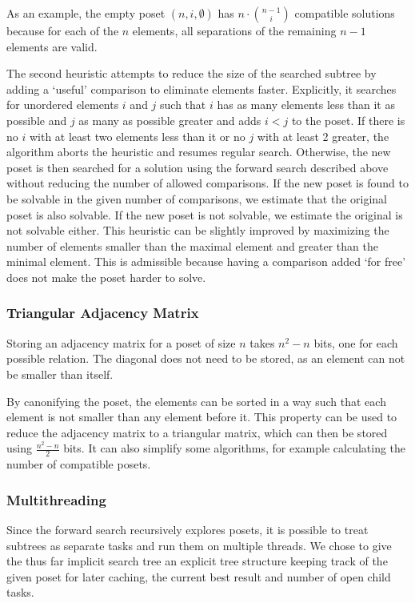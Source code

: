 \documentclass[10pt,journal,compsoc]{IEEEtran}
\begin{document}
As an example, the empty poset $(n,i,\emptyset)$ has $n \cdot \binom{n - 1}{i}$ compatible solutions because
for each of the $n$ elements, all separations of the remaining $n - 1$ elements
are valid.


The second heuristic attempts to reduce the size of the searched subtree by adding a `useful' comparison to eliminate elements faster.
Explicitly, it searches for unordered elements $i$ and $j$ such that $i$ has as many elements less than it as possible and $j$ as many as possible greater and adds $i < j$ to the poset.
If there is no $i$ with at least two elements less than it or no $j$ with at least 2 greater, the algorithm aborts the heuristic and resumes regular search.
Otherwise, the new poset is then searched for a solution using the forward search described above without reducing the number of allowed comparisons.
If the new poset is found to be solvable in the given number of comparisons, we estimate that the original poset is also solvable.
If the new poset is not solvable, we estimate the original is not solvable either.
This heuristic can be slightly improved by maximizing the number of elements smaller than the maximal element and greater than the minimal element.
This is admissible because having a comparison added `for free' does not make the poset harder to solve.

\subsubsection{Triangular Adjacency Matrix}
Storing an adjacency matrix for a poset of size $n$ takes $n^2 - n$ bits, one for each possible relation.
The diagonal does not need to be stored, as an element can not be smaller than itself.

By canonifying the poset, the elements can be sorted in a way such that each element is not smaller than any element before it.
This property can be used to reduce the adjacency matrix to a triangular matrix, which can then be stored using $\frac{n^2 - n}{2}$ bits.
It can also simplify some algorithms, for example calculating the number of compatible posets.

\subsubsection{Multithreading}

Since the forward search recursively explores posets, it is possible to treat subtrees as separate tasks and run them on multiple threads.
We chose to give the thus far implicit search tree an explicit tree structure keeping track of the given poset for later caching, the current best result and number of open child tasks.
\end{document}
